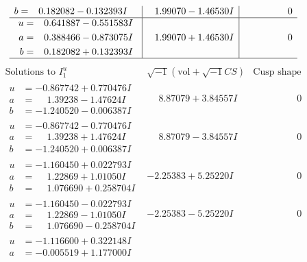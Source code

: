 \documentclass[1p]{elsarticle_modified}
\theoremstyle{definition}
\newcommand{\I}{\sqrt{-1}}
\begin{document}
$$\begin{array}{c|c|c}
\begin{aligned}
b &= \phantom{-}0.182082 - 0.132393 I\end{aligned}
 & \phantom{-}1.99070 - 1.46530 I & \phantom{-0.000000 } 0 \\ \hline\begin{aligned}
u &= \phantom{-}0.641887 - 0.551583 I \\
a &= \phantom{-}0.388466 - 0.873075 I \\
b &= \phantom{-}0.182082 + 0.132393 I\end{aligned}
 & \phantom{-}1.99070 + 1.46530 I & \phantom{-0.000000 } 0\\
 \hline 
 \end{array}$$\newpage$$\begin{array}{c|c|c}  
\text{Solutions to }I^u_{1}& \I (\text{vol} + \sqrt{-1}CS) & \text{Cusp shape}\\
 \hline 
\begin{aligned}
u &= -0.867742 + 0.770476 I \\
a &= \phantom{-}1.39238 - 1.47624 I \\
b &= -1.240520 - 0.006387 I\end{aligned}
 & \phantom{-}8.87079 + 3.84557 I & \phantom{-0.000000 } 0 \\ \hline\begin{aligned}
u &= -0.867742 - 0.770476 I \\
a &= \phantom{-}1.39238 + 1.47624 I \\
b &= -1.240520 + 0.006387 I\end{aligned}
 & \phantom{-}8.87079 - 3.84557 I & \phantom{-0.000000 } 0 \\ \hline\begin{aligned}
u &= -1.160450 + 0.022793 I \\
a &= \phantom{-}1.22869 + 1.01050 I \\
b &= \phantom{-}1.076690 + 0.258704 I\end{aligned}
 & -2.25383 + 5.25220 I & \phantom{-0.000000 } 0 \\ \hline\begin{aligned}
u &= -1.160450 - 0.022793 I \\
a &= \phantom{-}1.22869 - 1.01050 I \\
b &= \phantom{-}1.076690 - 0.258704 I\end{aligned}
 & -2.25383 - 5.25220 I & \phantom{-0.000000 } 0 \\ \hline\begin{aligned}
u &= -1.116600 + 0.322148 I \\
a &= -0.005519 + 1.177000 I \\

\end{aligned}
\end{array}$$
\end{document}
